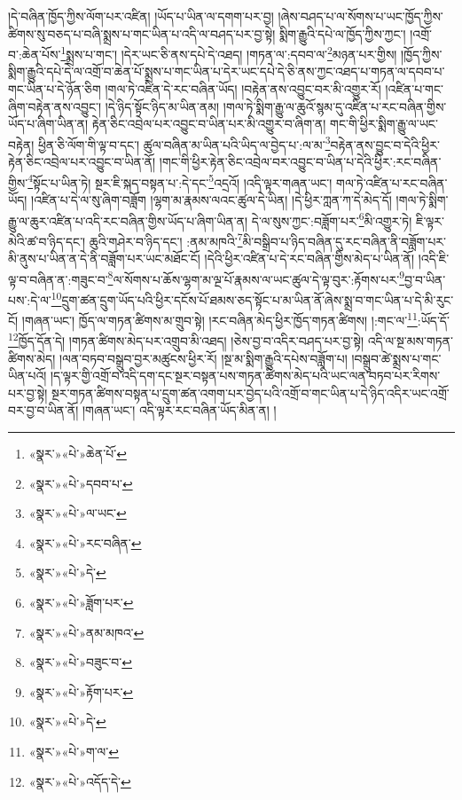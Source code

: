 །དེ་བཞིན་ཁྱོད་ཀྱིས་ལོག་པར་འཛིན། །ཡོད་པ་ཡིན་ལ་དགག་པར་བྱ། །ཞེས་བཤད་པ་ལ་སོགས་པ་ཡང་ཁྱོད་ཀྱིས་ཚིགས་སུ་བཅད་པ་བཞི་སྨྲས་པ་གང་ཡིན་པ་འདི་ལ་བཤད་པར་བྱ་སྟེ། སྨིག་རྒྱུའི་དཔེ་ལ་ཁྱོད་ཀྱིས་ཀྱང་། །འགྲོ་བ་:ཆེན་པོས་\footnote{«སྣར་»«པེ་»ཆེན་པོ་}སྨྲས་པ་གང་། །དེར་ཡང་ཅི་ནས་དཔེ་དེ་འཐད། །གཏན་ལ་:དབབ་ལ་\footnote{«སྣར་»«པེ་»དབབ་པ་}མཉན་པར་གྱིས། །ཁྱོད་ཀྱིས་སྨིག་རྒྱུའི་དཔེ་དེ་ལ་འགྲོ་བ་ཆེན་པོ་སྨྲས་པ་གང་ཡིན་པ་དེར་ཡང་དཔེ་དེ་ཅི་ནས་ཀྱང་འཐད་པ་གཏན་ལ་དབབ་པ་གང་ཡིན་པ་དེ་ཉོན་ཅིག །གལ་ཏེ་འཛིན་དེ་རང་བཞིན་ཡོད། །བརྟེན་ནས་འབྱུང་བར་མི་འགྱུར་རོ། །འཛིན་པ་གང་ཞིག་བརྟེན་ནས་འབྱུང་། །དེ་ཉིད་སྟོང་ཉིད་མ་ཡིན་ནམ། །གལ་ཏེ་སྨིག་རྒྱུ་ལ་ཆུའོ་སྙམ་དུ་འཛིན་པ་རང་བཞིན་གྱིས་ཡོད་པ་ཞིག་ཡིན་ན། རྟེན་ཅིང་འབྲེལ་པར་འབྱུང་བ་ཡིན་པར་མི་འགྱུར་བ་ཞིག་ན། གང་གི་ཕྱིར་སྨིག་རྒྱུ་ལ་ཡང་བརྟེན། ཕྱིན་ཅི་ལོག་གི་ལྟ་བ་དང་། ཚུལ་བཞིན་མ་ཡིན་པའི་ཡིད་ལ་བྱེད་པ་:ལ་མ་\footnote{«སྣར་»«པེ་»ལ་ཡང་}བརྟེན་ནས་བྱུང་བ་དེའི་ཕྱིར་རྟེན་ཅིང་འབྲེལ་པར་འབྱུང་བ་ཡིན་ནོ། །གང་གི་ཕྱིར་རྟེན་ཅིང་འབྲེལ་བར་འབྱུང་བ་ཡིན་པ་དེའི་ཕྱིར་:རང་བཞིན་གྱིས་\footnote{«སྣར་»«པེ་»རང་བཞིན་}སྟོང་པ་ཡིན་ཏེ། སྔར་ཇི་སྐད་བསྟན་པ་:དེ་དང་\footnote{«སྣར་»«པེ་»དེ་}འདྲའོ། །འདི་ལྟར་གཞན་ཡང་། གལ་ཏེ་འཛིན་པ་རང་བཞིན་ཡོད། །འཛིན་པ་དེ་ལ་སུ་ཞིག་བཟློག །ལྷག་མ་རྣམས་ལའང་ཚུལ་དེ་ཡིན། །དེ་ཕྱིར་ཀླན་ཀ་དེ་མེད་དོ། །གལ་ཏེ་སྨིག་རྒྱུ་ལ་ཆུར་འཛིན་པ་འདི་རང་བཞིན་གྱིས་ཡོད་པ་ཞིག་ཡིན་ན། དེ་ལ་སུས་ཀྱང་:བཟློག་པར་\footnote{«སྣར་»«པེ་»ཟློག་པར་}མི་འགྱུར་ཏེ། ཇི་ལྟར་མེའི་ཚ་བ་ཉིད་དང་། ཆུའི་གཤེར་བ་ཉིད་དང་། :ནམ་མཁའི་\footnote{«སྣར་»«པེ་»ནམ་མཁའ་}མི་བསྒྲིབ་པ་ཉིད་བཞིན་དུ་རང་བཞིན་ནི་བཟློག་པར་མི་ནུས་པ་ཡིན་ན་དེ་ནི་བཟློག་པར་ཡང་མཐོང་ངོ། །དེའི་ཕྱིར་འཛིན་པ་དེ་རང་བཞིན་གྱིས་མེད་པ་ཡིན་ནོ། །འདི་ཇི་ལྟ་བ་བཞིན་ན་:གཟུང་བ་\footnote{«སྣར་»«པེ་»བཟུང་བ་}ལ་སོགས་པ་ཆོས་ལྷག་མ་ལྔ་པོ་རྣམས་ལ་ཡང་ཚུལ་དེ་ལྟ་བུར་:རྟོགས་པར་\footnote{«སྣར་»«པེ་»རྟོག་པར་}བྱ་བ་ཡིན་པས་:དེ་ལ་\footnote{«སྣར་»«པེ་»དེ་}དྲུག་ཚན་དྲུག་ཡོད་པའི་ཕྱིར་དངོས་པོ་ཐམས་ཅད་སྟོང་པ་མ་ཡིན་ནོ་ཞེས་སྨྲ་བ་གང་ཡིན་པ་དེ་མི་རུང་ངོ། །གཞན་ཡང་། ཁྱོད་ལ་གཏན་ཚིགས་མ་གྲུབ་སྟེ། །རང་བཞིན་མེད་ཕྱིར་ཁྱོད་གཏན་ཚིགས། །:གང་ལ་\footnote{«སྣར་»«པེ་»ག་ལ་}:ཡོད་དོ་\footnote{«སྣར་»«པེ་»འདོད་དེ་}ཁྱོད་དོན་དེ། །གཏན་ཚིགས་མེད་པར་འགྲུབ་མི་འཐད། །ཅེས་བྱ་བ་འདིར་བཤད་པར་བྱ་སྟེ། འདི་ལ་སྔ་མས་གཏན་ཚིགས་མེད། །ལན་བཏབ་བསྒྲུབ་བྱར་མཚུངས་ཕྱིར་རོ། །སྔ་མ་སྨིག་རྒྱུའི་དཔེས་བཟློག་པ། །བསྒྲུབ་ཚེ་སྨྲས་པ་གང་ཡིན་པའོ། །ད་ལྟར་གྱི་འགྲོ་བ་འདི་དག་དང་སྔར་བསྟན་པས་གཏན་ཚིགས་མེད་པའི་ཡང་ལན་བཏབ་པར་རིགས་པར་བྱ་སྟེ། སྔར་གཏན་ཚིགས་བསྟན་པ་དྲུག་ཚན་འགག་པར་བྱེད་པའི་འགྲོ་བ་གང་ཡིན་པ་དེ་ཉིད་འདིར་ཡང་འགྲོ་བར་བྱ་བ་ཡིན་ནོ། །གཞན་ཡང་། འདི་ལྟར་རང་བཞིན་ཡོད་མིན་ན། །
